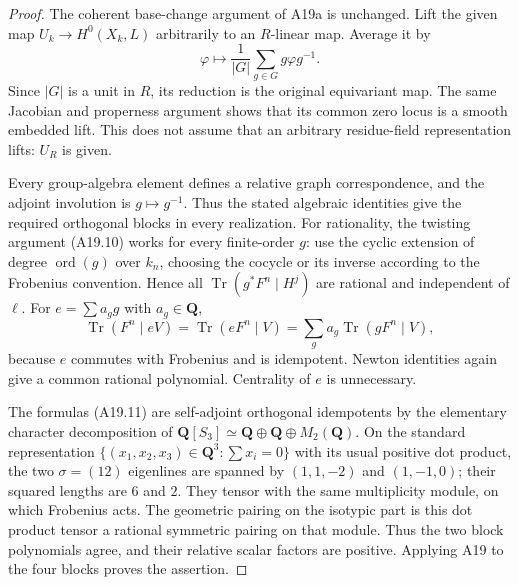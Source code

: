 \documentclass[11pt]{article}
\theoremstyle{remark}\newtheorem{remark}[theorem]{Remark}
\begin{document}
\begin{proof}
The coherent base-change argument of A19a is unchanged.
Lift the given map $U_k\to H^0(X_k,L)$ arbitrarily to
an $R$-linear map. Average it by
\[
                 \varphi\longmapsto
       \frac1{|G|}\sum_{g\in G}g\varphi g^{-1}.
 \tag{A19.12}
\]
Since $|G|$ is a unit in $R$, its reduction is the
original equivariant map. The same Jacobian and properness
argument shows that its common zero locus is a smooth
embedded lift. This does not assume that an arbitrary
residue-field representation lifts: $U_R$ is given.

Every group-algebra element defines a relative graph
correspondence, and the adjoint involution is $g\mapsto g^{-1}$.
Thus the stated algebraic identities give the required
orthogonal blocks in every realization. For rationality,
the twisting argument (A19.10) works for every finite-order
$g$: use the cyclic extension of degree $\operatorname{ord}(g)$
over $k_n$, choosing the cocycle or its inverse according
to the Frobenius convention. Hence all
$\operatorname{Tr}(g^*F^n\mid H^j)$ are rational and
independent of $\ell$. For $e=\sum a_gg$ with $a_g\in\mathbf Q$,
\[
       \operatorname{Tr}(F^n\mid eV)
                    =\operatorname{Tr}(eF^n\mid V)
                    =\sum_g a_g\operatorname{Tr}(gF^n\mid V),
 \tag{A19.13}
\]
because $e$ commutes with Frobenius and is idempotent.
Newton identities again give a common rational polynomial.
Centrality of $e$ is unnecessary.

The formulas (A19.11) are self-adjoint orthogonal
idempotents by the elementary character decomposition
of $\mathbf Q[S_3]\simeq\mathbf Q\oplus\mathbf Q\oplus M_2(\mathbf Q)$.
On the standard representation
$\{(x_1,x_2,x_3)\in\mathbf Q^3:\sum x_i=0\}$ with
its usual positive dot product, the two $\sigma=(12)$
eigenlines are spanned by $(1,1,-2)$ and $(1,-1,0)$;
their squared lengths are $6$ and $2$. They tensor with
the same multiplicity module, on which Frobenius acts.
The geometric pairing on the isotypic part is this
dot product tensor a rational symmetric pairing on
that module. Thus the two block polynomials agree,
and their relative scalar factors are positive.
Applying A19 to the four blocks proves the assertion.
\end{proof}
\end{document}
